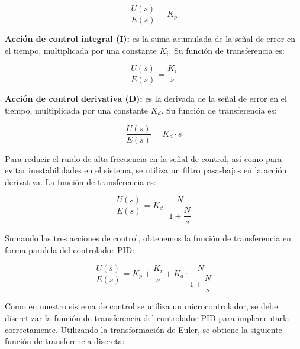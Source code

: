 \vspace{-0.5cm}
\begin{equation}
    \dfrac{U(s)}{E(s)} = K_p
\end{equation}
\vspace{-0.5cm}

\textbf{Acción de control integral (I):} es la suma acumulada de la señal de error en el tiempo, multiplicada
por una constante $K_i$. Su función de transferencia es:

\vspace{-0.5cm}
\begin{equation}
    \dfrac{U(s)}{E(s)} = \dfrac{K_i}{s}
\end{equation}
\vspace{-0.5cm}

\textbf{Acción de control derivativa (D):} es la derivada de la señal de error en el tiempo, multiplicada por
una constante $K_d$. Su función de transferencia es:

\vspace{-0.5cm}
\begin{equation}
    \dfrac{U(s)}{E(s)} = K_d \cdot s
\end{equation}
\vspace{-0.5cm}

Para reducir el ruido de alta frecuencia en la señal de control, así como para evitar inestabilidades
en el sistema, se utiliza un filtro pasa-bajos en la acción derivativa. La función de transferencia es:

\vspace{-0.5cm}
\begin{equation}
    \dfrac{U(s)}{E(s)} = K_d \cdot \dfrac{N}{1+\dfrac{N}{s}}
\end{equation}
\vspace{-0.5cm}

Sumando las tres acciones de control, obtenemos la función de transferencia en forma paralela del controlador PID:

\vspace{-0.5cm}
\begin{equation}
    \dfrac{U(s)}{E(s)} = K_p + \dfrac{K_i}{s} + K_d \cdot \dfrac{N}{1+\dfrac{N}{s}}
\end{equation}
\vspace{-0.5cm}

Como en nuestro sistema de control se utiliza un microcontrolador, se debe discretizar la función de transferencia
del controlador PID para implementarla correctamente. Utilizando la transformación de Euler, se obtiene la siguiente
función de transferencia discreta:

